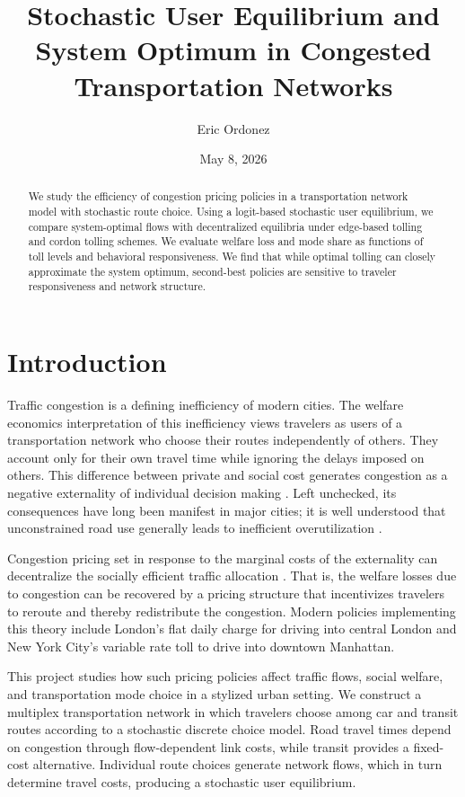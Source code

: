 \documentclass[12pt]{article}
\title{Stochastic User Equilibrium and System Optimum in Congested Transportation Networks}
\author{Eric Ordonez}
\date{May 8, 2026}
\begin{document}
\maketitle

\begin{abstract}
    We study the efficiency of congestion pricing policies in a transportation network model with stochastic route choice.
    Using a logit-based stochastic user equilibrium, we compare system-optimal flows with decentralized equilibria under edge-based tolling and cordon tolling schemes.
    We evaluate welfare loss and mode share as functions of toll levels and behavioral responsiveness.
    We find that while optimal tolling can closely approximate the system optimum, second-best policies are sensitive to traveler responsiveness and network structure.
\end{abstract}

\section{Introduction}

Traffic congestion is a defining inefficiency of modern cities.
The welfare economics interpretation of this inefficiency views travelers as users of a transportation network who choose their routes independently of others.
They account only for their own travel time while ignoring the delays imposed on others. 
This difference between private and social cost generates congestion as a negative externality of individual decision making \citep{pigou1920welfare}.
Left unchecked, its consequences have long been manifest in major cities; it is well understood that unconstrained road use generally leads to inefficient overutilization \citep{knight1924socialcost}.

Congestion pricing set in response to the marginal costs of the externality can decentralize the socially efficient traffic allocation \citep{vickrey1969congestion}.
That is, the welfare losses due to congestion can be recovered by a pricing structure that incentivizes travelers to reroute and thereby redistribute the congestion.
Modern policies implementing this theory include London's flat daily charge for driving into central London and New York City's variable rate toll to drive into downtown Manhattan.

This project studies how such pricing policies affect traffic flows, social welfare, and transportation mode choice in a stylized urban setting.
We construct a multiplex transportation network in which travelers choose among car and transit routes according to a stochastic discrete choice model.
Road travel times depend on congestion through flow-dependent link costs, while transit provides a fixed-cost alternative.
Individual route choices generate network flows, which in turn determine travel costs, producing a stochastic user equilibrium.
\end{document}
